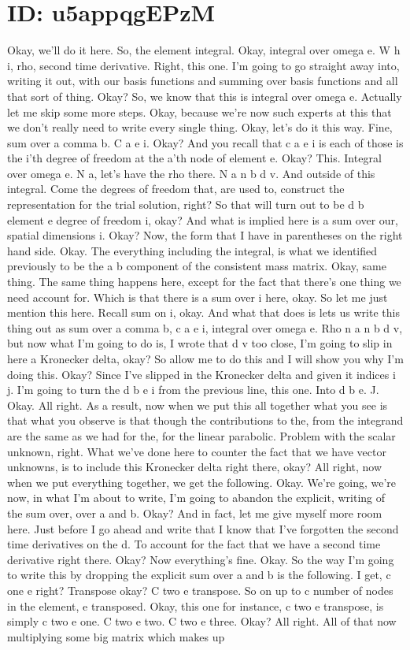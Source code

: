 \documentclass[10pt]{article}
\begin{document}
\section*{ID: u5appqgEPzM}
Okay, we'll do it here. So, the element integral. Okay, integral over omega e. W h i, rho, second time derivative. Right, this one. I'm going to go straight away into, writing it out, with our basis functions and summing over basis functions and all that sort of thing. Okay? So, we know that this is integral over omega e. Actually let me skip some more steps. Okay, because we're now such experts at this that we don't really need to write every single thing. Okay, let's do it this way. Fine, sum over a comma b. C a e i. Okay? And you recall that c a e i is each of those is the i'th degree of freedom at the a'th node of element e. Okay? This. Integral over omega e. N a, let's have the rho there. N a n b d v. And outside of this integral. Come the degrees of freedom that, are used to, construct the representation for the trial solution, right? So that will turn out to be d b element e degree of freedom i, okay? And what is implied here is a sum over our, spatial dimensions i. Okay? Now, the form that I have in parentheses on the right hand side. Okay. The everything including the integral, is what we identified previously to be the a b component of the consistent mass matrix. Okay, same thing. The same thing happens here, except for the fact that there's one thing we need account for. Which is that there is a sum over i here, okay. So let me just mention this here. Recall sum on i, okay. And what that does is lets us write this thing out as sum over a comma b, c a e i, integral over omega e. Rho n a n b d v, but now what I'm going to do is, I wrote that d v too close, I'm going to slip in here a Kronecker delta, okay? So allow me to do this and I will show you why I'm doing this. Okay? Since I've slipped in the Kronecker delta and given it indices i j. I'm going to turn the d b e i from the previous line, this one. Into d b e. J. Okay. All right. As a result, now when we put this all together what you see is that what you observe is that though the contributions to the, from the integrand are the same as we had for the, for the linear parabolic. Problem with the scalar unknown, right. What we've done here to counter the fact that we have vector unknowns, is to include this Kronecker delta right there, okay? All right, now when we put everything together, we get the following. Okay. We're going, we're now, in what I'm about to write, I'm going to abandon the explicit, writing of the sum over, over a and b. Okay? And in fact, let me give myself more room here. Just before I go ahead and write that I know that I've forgotten the second time derivatives on the d. To account for the fact that we have a second time derivative right there. Okay? Now everything's fine. Okay. So the way I'm going to write this by dropping the explicit sum over a and b is the following. I get, c one e right? Transpose okay? C two e transpose. So on up to c number of nodes in the element, e transposed. Okay, this one for instance, c two e transpose, is simply c two e one. C two e two. C two e three. Okay? All right. All of that now multiplying some big matrix which makes up 
\end{document}
